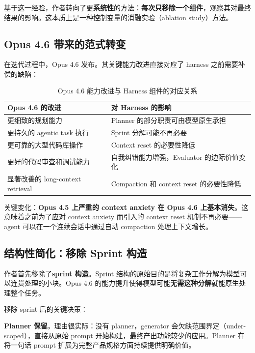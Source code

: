 \documentclass[a4paper]{article}
\begin{document}
基于这一经验，作者转向了更\textbf{系统性}的方法：\textbf{每次只移除一个组件}，观察其对最终结果的影响。这本质上是一种控制变量的消融实验（ablation study）方法。

\subsection{Opus 4.6 带来的范式转变}

在迭代过程中，Opus 4.6 发布。其关键能力改进直接对应了 harness 之前需要补偿的缺陷：

\begin{table}[H]
\centering
\renewcommand{\arraystretch}{1.3}
\begin{tabular}{p{5cm}p{7.5cm}}
\toprule
\textbf{Opus 4.6 的改进} & \textbf{对 Harness 的影响} \\
\midrule
更细致的规划能力 & Planner 的部分职责可由模型原生承担 \\
\midrule
更持久的 agentic task 执行 & Sprint 分解可能不再必要 \\
\midrule
更可靠的大型代码库操作 & Context reset 的必要性降低 \\
\midrule
更好的代码审查和调试能力 & 自我纠错能力增强，Evaluator 的边际价值变化 \\
\midrule
显著改善的 long-context retrieval & Compaction 和 context reset 的必要性降低 \\
\bottomrule
\end{tabular}
\caption{Opus 4.6 能力改进与 Harness 组件的对应关系}
\end{table}

关键变化：\textbf{Opus 4.5 上严重的 context anxiety 在 Opus 4.6 上基本消失}。这意味着之前为了应对 context anxiety 而引入的 context reset 机制不再必要——agent 可以在一个连续会话中通过自动 compaction 处理上下文增长。

\subsection{结构性简化：移除 Sprint 构造}

作者首先移除了\textbf{sprint 构造}。Sprint 结构的原始目的是将复杂工作分解为模型可以连贯处理的小块。Opus 4.6 的能力提升使得模型可能\textbf{无需这种分解}就能原生处理整个任务。

移除 sprint 后的关键决策：

\textbf{Planner 保留}。理由很实际：没有 planner，generator 会欠缺范围界定（under-scoped），直接从原始 prompt 开始构建，最终产出功能较少的应用。Planner 在将一句话 prompt 扩展为完整产品规格方面持续提供明确价值。
\end{document}
